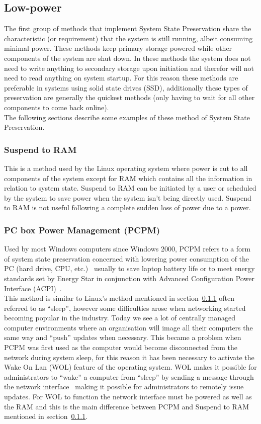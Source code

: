 \documentclass[a4,12pt]{article}
\begin{document}
\subsection{Low-power}\label{sec:lowpower}
The first group of methods that implement System State Preservation share the characteristic (or requirement) that the system is still running, albeit consuming minimal power. These methods keep primary storage powered while other components of the system are shut down. In these methods the system does not need to write anything to secondary storage upon initiation and therefor will not need to read anything on system startup. For this reason these methods are preferable in systems using solid state drives (SSD), additionally these types of preservation are generally the quickest methods (only having to wait for all other components to come back online).
\\The following sections describe some examples of these method of System State Preservation.

\subsubsection{Suspend to RAM}\label{sec:stRam}
This is a method used by the Linux operating system where power is cut to all components of the system except for RAM which contains all the information in relation to system state.\citep{Wiki}
Suspend to RAM can be initiated by a user or scheduled by the system to save power when the system isn't being directly used. Suspend to RAM is not useful following a complete sudden loss of power due to a power.
\subsubsection{PC box Power Management (PCPM)}\label{sec:PCPM}
Used by most Windows computers since Windows 2000, PCPM refers to a form of system state preservation concerned with lowering power consumption of the PC (hard drive, CPU, etc.)~\citep{PCPM} usually to save laptop battery life or to meet energy standards set by Energy Star in conjunction with Advanced Configuration Power Interface (ACPI)~\citep{PCPM}.
\\This method is similar to Linux's method mentioned in section~\ref{sec:stRam} often referred to as ``sleep'', however some difficulties arose when networking started becoming popular in the industry. Today we see a lot of centrally managed computer environments where an organisation will image all their computers the same way and ``push'' updates when necessary. This became a problem when PCPM was first used as the computer would become disconnected from the network during system sleep, for this reason it has been necessary to activate the Wake On Lan (WOL) feature of the operating system. WOL makes it possible for administrators to ``wake'' a computer from ``sleep'' by sending a message through the network interface~\citep{WOL} making it possible for administrators to remotely issue updates. For WOL to function the network interface must be powered as well as the RAM and this is the main difference between PCPM and Suspend to RAM mentioned in section~\ref{sec:stRam}.
\end{document}
